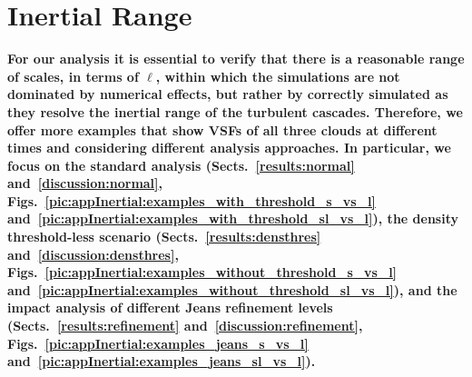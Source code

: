 
\section{Inertial Range}\label{appInertial}


\textbf{\noindent
	For our analysis it is essential to verify that there is a reasonable range of scales, in terms of $\ell$, within which the simulations are not dominated by numerical effects, but rather by correctly simulated as they resolve the inertial range of the turbulent cascades.
    Therefore, we offer more examples that show VSFs of all three clouds at different times and considering different analysis approaches.
    In particular, we focus on the standard analysis (Sects.~\ref{results:normal} and~\ref{discussion:normal}, Figs.~\ref{pic:appInertial:examples_with_threshold_s_vs_l} and~\ref{pic:appInertial:examples_with_threshold_sl_vs_l}), the density threshold-less scenario (Sects.~\ref{results:densthres} and~\ref{discussion:densthres}, Figs.~\ref{pic:appInertial:examples_without_threshold_s_vs_l} and~\ref{pic:appInertial:examples_without_threshold_sl_vs_l}), and the impact analysis of different Jeans refinement levels (Sects.~\ref{results:refinement} and~\ref{discussion:refinement}, Figs.~\ref{pic:appInertial:examples_jeans_s_vs_l} and~\ref{pic:appInertial:examples_jeans_sl_vs_l}).
}
 	
